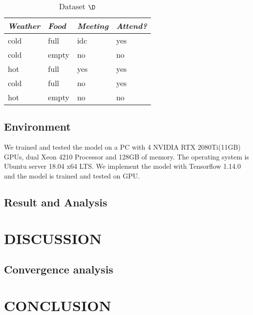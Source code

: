 \documentclass{article}
\begin{document}
	\begin{table}[h]
		\centering
		\begin{tabular}{@{}lll|l@{}}
			\toprule
			\textit{Weather}    & \textit{Food} & \textit{Meeting}  & \textit{Attend?} \\ \midrule
			cold                & full          & idc               & yes              \\
			cold & empty & no & no               \\
			hot & full & yes & yes              \\
			cold & full & no & yes              \\
			hot & empty & no & no               \\ \bottomrule
		\end{tabular}
		\caption{Dataset $\D$\label{table:1}}
	\end{table}
	\crule[blue]{1cm}{1cm}
	\crule[#123456]{1cm}{1cm}

	\subsection{Environment}\label{subsec:environment}
	We trained and tested the model on a PC with 4 NVIDIA RTX 2080Ti(11GB) GPUs, dual Xeon 4210 Processor
	and 128GB of memory.
	The operating system is Ubuntu server 18.04 x64 LTS\@.
	We implement the model with Tensorflow 1.14.0 and the model is trained and tested on GPU\@.

	\subsection{Result and Analysis}\label{subsec:result-and-analysis}


	\section{DISCUSSION}\label{sec:discussion}

	\subsection{Convergence analysis}\label{subsec:convergence}


	\section{CONCLUSION}\label{sec:conclusion}


	
\end{document}
